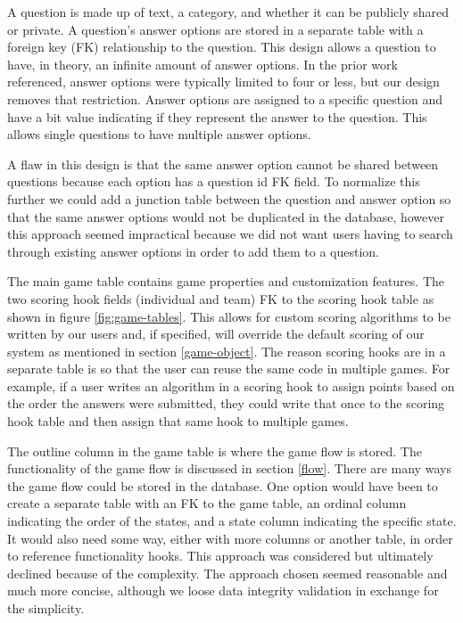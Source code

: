 \documentclass{article}
\begin{document}
		A question is made up of text, a category, and whether it can be publicly shared or private. A question's answer options are stored in a separate table with a foreign key (FK) relationship to the question. This design allows a question to have, in theory, an infinite amount of answer options. In the prior work referenced, answer options were typically limited to four or less, but our design removes that restriction. Answer options are assigned to a specific question and have a bit value indicating if they represent the answer to the question. This allows single questions to have multiple answer options.
		\smallskip
		
		A flaw in this design is that the same answer option cannot be shared between questions because each option has a question id FK field.  To normalize this further we could add a junction table between the question and answer option so that the same answer options would not be duplicated in the database, however this approach seemed impractical because we did not want users having to search through existing answer options in order to add them to a question.
		\smallskip
		
		The main game table contains game properties and customization features. The two scoring hook fields (individual and team) FK to the scoring hook table as shown in figure \ref{fig:game-tables}. This allows for custom scoring algorithms to be written by our users and, if specified, will override the default scoring of our system as mentioned in section \ref{game-object}. The reason scoring hooks are in a separate table is so that the user can reuse the same code in multiple games. For example, if a user writes an algorithm in a scoring hook to assign points based on the order the answers were submitted, they could write that once to the scoring hook table and then assign that same hook to multiple games.
		\smallskip
		
		The outline column in the game table is where the game flow is stored. The functionality of the game flow is discussed in section \ref{flow}. There are many ways the game flow could be stored in the database. One option would have been to create a separate table with an FK to the game table, an ordinal column indicating the order of the states, and a state column indicating the specific state. It would also need some way, either with more columns or another table, in order to reference functionality hooks. This approach was considered but ultimately declined because of the complexity. The approach chosen seemed reasonable and much more concise, although we loose data integrity validation in exchange for the simplicity.
		\smallskip
		
\end{document}
